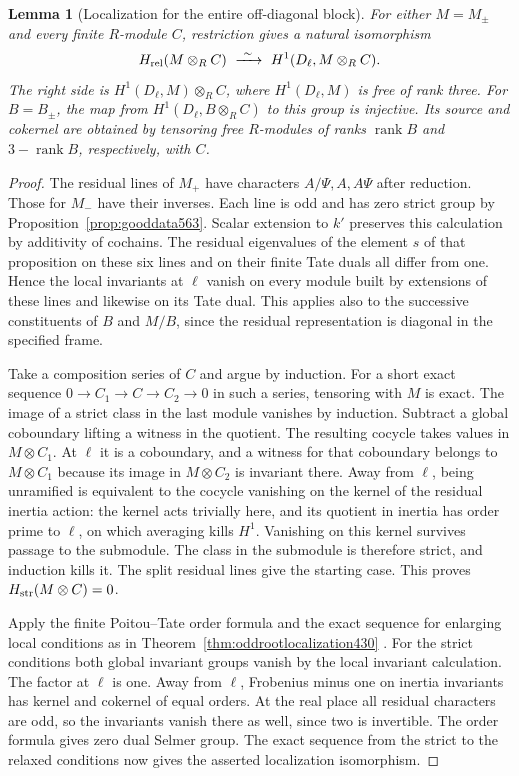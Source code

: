 \documentclass[a4paper,11pt]{article}
\newtheorem{lemma}[proposition]{Lemma}
\theoremstyle{definition}
\theoremstyle{remark}
\numberwithin{equation}{section}
\begin{document}
\begin{lemma}[Localization for the entire off-diagonal block]
\leavevmode\label{lem:crosslocal568}
For either \(M=M_\pm\) and every finite \(R\)-module \(C\),
restriction gives a natural isomorphism
\[
       H_{\rm rel}(M\otimes_R C)
           \ \xrightarrow{\ \sim\ }\ H^1(D_\ell,M\otimes_R C).
\]
The right side is \(H^1(D_\ell,M)\otimes_R C\), where
\(H^1(D_\ell,M)\) is free of rank three. For \(B=B_\pm\),
the map from \(H^1(D_\ell,B\otimes_R C)\) to this group is
injective. Its source and cokernel are obtained by tensoring
free \(R\)-modules of ranks \(\operatorname{rank} B\) and
\(3-\operatorname{rank}B\), respectively, with \(C\).
\end{lemma}
\begin{proof}
The residual lines of \(M_+\) have characters \(A/\Psi,A,A\Psi\)
after reduction. Those for \(M_-\) have their inverses. Each
line is odd and has zero strict group by
Proposition~\ref{prop:gooddata563}. Scalar extension to \(k'\)
preserves this calculation by additivity of cochains. The
residual eigenvalues of the element \(s\) of that proposition
on these six lines and on their finite Tate duals all differ
from one. Hence the local invariants at \(\ell\) vanish on
every module built by extensions of these lines and likewise
on its Tate dual. This applies also to the successive
constituents of \(B\) and \(M/B\), since the residual
representation is diagonal in the specified frame.

Take a composition series of \(C\) and argue by induction.
For a short exact sequence \(0\to C_1\to C\to C_2\to0\)
in such a series, tensoring with \(M\) is exact. The image
of a strict class in the last module vanishes by induction.
Subtract a global coboundary lifting a witness in the
quotient. The resulting cocycle takes values in
\(M\otimes C_1\). At \(\ell\) it is a coboundary, and a
witness for that coboundary belongs to \(M\otimes C_1\)
because its image in \(M\otimes C_2\) is invariant there.
Away from \(\ell\), being unramified is equivalent to the
cocycle vanishing on the kernel of the residual inertia
action: the kernel acts trivially here, and its quotient in
inertia has order prime to \(\ell\), on which averaging kills
\(H^1\). Vanishing on this kernel survives passage to the
submodule. The class in the submodule is therefore strict,
and induction kills it. The split residual lines give the
starting case. This proves \(H_{\rm str}(M\otimes C)=0\).

Apply the finite Poitou--Tate order formula and the exact
sequence for enlarging local conditions as in
Theorem~\ref{thm:oddrootlocalization430}
\cite{XII-IX-V-milne98}. For the strict conditions both global
invariant groups vanish by the local invariant calculation.
The factor at \(\ell\) is one. Away from \(\ell\), Frobenius
minus one on inertia invariants has kernel and cokernel of
equal orders. At the real place all residual characters are
odd, so the invariants vanish there as well, since two is
invertible. The order formula gives zero dual Selmer group.
The exact sequence from the strict to the relaxed conditions
now gives the asserted localization isomorphism.


\end{proof}
\end{document}
